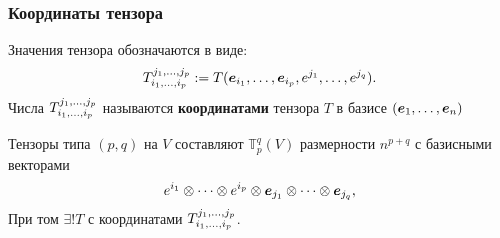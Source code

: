 \subsubsection{Координаты тензора}

\begin{to_def}
    Значения тензора обозначаются в виде:
    \begin{equation}
            T_{i_1, \dots, i_p}^{j_1, \dots, j_p} := T(\mbox{\boldmath $e$}_{i_1}, \dots, \mbox{\boldmath $e$}_{i_p}, e^{j_1}, \dots, e^{j_q}).
    \end{equation}  
    Числа  $T_{i_1, \dots, i_p}^{j_1, \dots, j_p}$ называются \textbf{координатами} тензора $T$ в базисе $(\mbox{\boldmath $e$}_1, \dots, \mbox{\boldmath $e$}_n)$
\end{to_def}

\begin{to_thr}
    Тензоры типа $(p, q)$ на $V$ составляют $\mathbb{T}_p^q (V)$ размерности $n^{p+q}$ с базисными векторами
    \begin{equation}
        e^{i_1} \otimes \dots \otimes  e^{i_p} \otimes \mbox{\boldmath $e$}_{j_1} \otimes \dots \otimes \mbox{\boldmath $e$}_{j_q},
    \end{equation}
    При том $\exists ! T$ с координатами $T_{i_1, \dots, i_p}^{j_1, \dots, j_p}$.
\end{to_thr}


